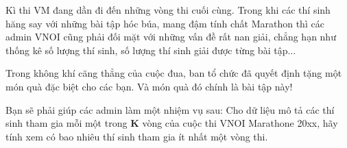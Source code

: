 Kì thi VM đang dần đi đến những vòng thi cuối cùng. Trong khi các thí sinh hăng say với những bài tập hóc búa, mang đậm tính chất Marathon thì các admin VNOI cũng phải đối mặt với những vấn đề rất nan giải, chẳng hạn như thống kê số lượng thí sinh, số lượng thí sinh giải được từng bài tập...

Trong không khí căng thẳng của cuộc đua, ban tổ chức đã quyết định tặng một món quà đặc biệt cho các bạn. Và món quà đó chính là bài tập này!

Bạn sẽ phải giúp các admin làm một nhiệm vụ sau: Cho dữ liệu mô tả các thí sinh tham gia mỗi một trong \textbf{ K } vòng của cuộc thi VNOI Marathone 20xx, hãy tính xem có bao nhiêu thí sinh tham gia ít nhất một vòng thi.